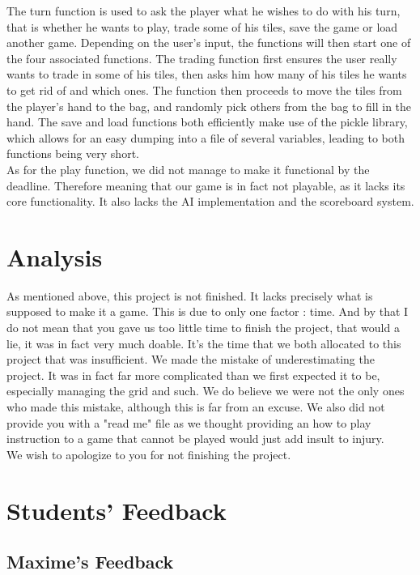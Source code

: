 \documentclass{article}
\begin{document}
The turn function is used to ask the player what he wishes to do with his turn, that is whether he wants to play, trade some of his tiles, save the game or load another game. Depending on the user's input, the functions will then start one of the four associated functions. The trading function first ensures the user really wants to trade in some of his tiles, then asks him how many of his tiles he wants to get rid of and which ones. The function then proceeds to move the tiles from the player's hand to the bag, and randomly pick others from the bag to fill in the hand. The save and load functions both efficiently make use of the pickle library, which allows for an easy dumping into a file of several variables, leading to both functions being very short. \\
As for the play function, we did not manage to make it functional by the deadline. Therefore meaning that our game is in fact not playable, as it lacks its core functionality. It also lacks the AI implementation and the scoreboard system. 

\section{Analysis} 

As mentioned above, this project is not finished. It lacks precisely what is supposed to make it a game. This is due to only one factor : time. And by that I do not mean that you gave us too little time to finish the project, that would a lie, it was in fact very much doable. It's the time that we both allocated to this project that was insufficient. We made the mistake of underestimating the project. It was in fact far more complicated than we first expected it to be, especially managing the grid and such. We do believe we were not the only ones who made this mistake, although this is far from an excuse. We also did not provide you with a "read me" file as we thought providing an how to play instruction to a game that cannot be played would just add insult to injury. \\
We wish to apologize to you for not finishing the project.

\section{Students' Feedback}

\subsection{Maxime's Feedback}
\end{document}
